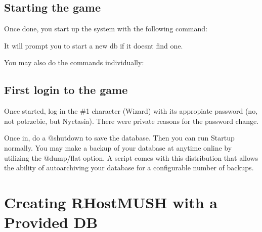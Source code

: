 \documentclass[letterpaper,10pt,english]{sphinxmanual}
\begin{document}
\subsection{Starting the game}
\label{\detokenize{install:starting-the-game}}
\sphinxAtStartPar
Once done, you start up the system with the following command:

\begin{sphinxVerbatim}[commandchars=\\\{\}]
\end{sphinxVerbatim}

\sphinxAtStartPar
It will prompt you to start a new db if it doesn\textquotesingle{}t find one.

\sphinxAtStartPar
You may also do the commands individually:

\begin{sphinxVerbatim}[commandchars=\\\{\}]
\PYG{p}{[}\PYG{p}{]}      
\PYG{p}{[}\PYG{p}{]}        
\end{sphinxVerbatim}


\subsection{First login to the game}
\label{\detokenize{install:first-login-to-the-game}}
\sphinxAtStartPar
Once started, log in the \#1 character (Wizard) with it\textquotesingle{}s appropiate
password (no, not \textquotesingle{}potrzebie\textquotesingle{}, but \textquotesingle{}Nyctasia\textquotesingle{}).  There were private
reasons for the password change.

\sphinxAtStartPar
Once in, do a @shutdown to save the database.  Then you can run Startup
normally.   You may make a backup of your database at anytime on\sphinxhyphen{}line by
utilizing the @dump/flat option.  A script comes with this distribution
that allows the ability of auto\sphinxhyphen{}archiving your database for a configurable
number of backups.


\section{Creating RHostMUSH with a Provided DB}
\label{\detokenize{install:creating-rhostmush-with-a-provided-db}}
\end{document}
